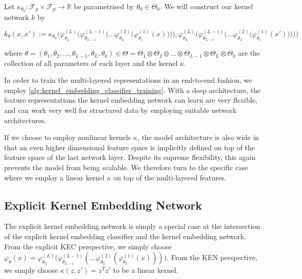 \documentclass{article}
\begin{document}
		Let $\kappa_{\theta_{0}} : \mathcal{F}_{p} \times \mathcal{F}_{p} \to \mathbb{R}$ be parametrised by $\theta_{0} \in \Theta_{0}$. We will construct our kernel network $k$ by
		
		\begin{equation}
			k_{\theta}(x, x') := \kappa_{\theta_{0}}\Bigg( \varphi^{(L)}_{\theta_{L}}\bigg(\varphi^{(L - 1)}_{\theta_{L - 1}}\Big(\dots\varphi^{(2)}_{\theta_{2}}\big(\varphi^{(1)}_{\theta_{1}}(x)\big)\Big)\bigg), \varphi^{(L)}_{\theta_{L}}\bigg(\varphi^{(L - 1)}_{\theta_{L - 1}}\Big(\dots\varphi^{(2)}_{\theta_{2}}\big(\varphi^{(1)}_{\theta_{1}}(x')\big)\Big)\bigg) \Bigg)
		\label{eq:deep_kernel_embedding_network}
		\end{equation}
		
		where $\theta = (\theta_{1}, \theta_{2}, \dots, \theta_{L -1}, \theta_{L}, \theta_{0}) \in \Theta = \Theta_{1} \otimes \Theta_{2} \otimes \dots \otimes \Theta_{L - 1} \otimes \Theta_{L} \otimes \Theta_{0}$ are the collection of all parameters of each layer and the kernel $\kappa$.
		
		In order to train the multi-layered representations in an end-to-end fashion, we employ \cref{alg:kernel_embedding_classifier_training}. With a deep architecture, the feature representations the kernel embedding network can learn are very flexible, and can work very well for structured data by employing suitable network architectures.
		
		If we choose to employ nonlinear kernels $\kappa$, the model architecture is also wide in that an even higher dimensional feature space is implicitly defined on top of the feature space of the last network layer. Despite its supreme flexibility, this again prevents the model from being scalable. We therefore turn to the specific case where we employ a linear kernel $\kappa$ on top of the multi-layered features.

	\subsection{Explicit Kernel Embedding Network}
	\label{app:explicit_kernel_embedding_network}

		The explicit kernel embedding network is simply a special case at the intersection of the explicit kernel embedding classifier and the kernel embedding network. From the explicit KEC perspective, we simply choose $\varphi_{\theta}(x) = \varphi^{(L)}_{\theta_{L}}\big(\varphi^{(L - 1)}_{\theta_{L - 1}}(\dots\varphi^{(2)}_{\theta_{2}}(\varphi^{(1)}_{\theta_{1}}(x)))\big)$. From the KEN perspective, we simply choose $\kappa(z, z') = z^{T} z'$ to be a linear kernel.
		
\end{document}
